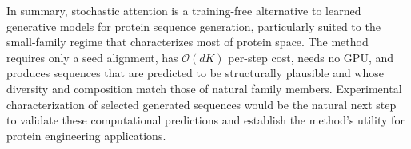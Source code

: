 In summary, stochastic attention is a training-free alternative to learned generative models for protein sequence generation, particularly suited to the small-family regime that characterizes most of protein space. The method requires only a seed alignment, has $\mathcal{O}(dK)$ per-step cost, needs no GPU, and produces sequences that are predicted to be structurally plausible and whose diversity and composition match those of natural family members. Experimental characterization of selected generated sequences would be the natural next step to validate these computational predictions and establish the method's utility for protein engineering applications.